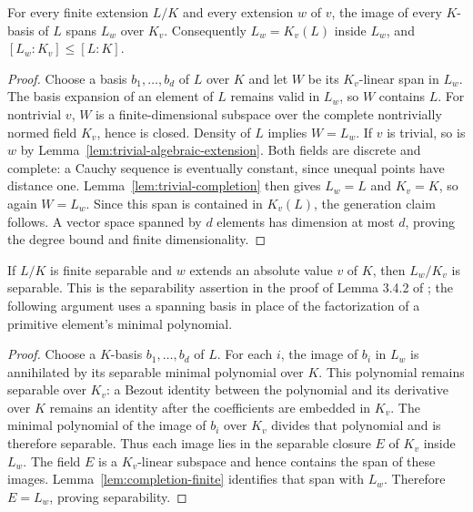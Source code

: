 \begin{lemma}\label{lem:completion-finite}
\leanok
{}
For every finite extension $L/K$ and every extension $w$ of $v$,
the image of every $K$-basis of $L$ spans $L_w$ over $K_v$.
Consequently $L_w=K_v(L)$ inside $L_w$, and $[L_w:K_v]\leq[L:K]$.
\end{lemma}
\begin{proof}
Choose a basis $b_1,\ldots,b_d$ of $L$ over $K$ and let $W$ be
its $K_v$-linear span in $L_w$. The basis expansion of an element of
$L$ remains valid in $L_w$, so $W$ contains $L$. For nontrivial $v$,
$W$ is a finite-dimensional subspace over the complete nontrivially
normed field $K_v$, hence is closed. Density of $L$ implies $W=L_w$.
If $v$ is trivial, so is $w$ by
Lemma~\ref{lem:trivial-algebraic-extension}. Both fields are discrete and complete:
a Cauchy sequence is eventually constant, since unequal points have distance
one. Lemma~\ref{lem:trivial-completion} then gives $L_w=L$ and $K_v=K$,
so again $W=L_w$. Since this span is contained in $K_v(L)$, the generation
claim follows. A vector space spanned by $d$ elements has dimension at most
$d$, proving the degree bound and finite dimensionality.
\end{proof}

\begin{lemma}
\label{lem:completion-separable}
\leanok
{}
If $L/K$ is finite separable and $w$ extends an absolute value $v$ of $K$,
then $L_w/K_v$ is separable. This is the separability assertion in the
proof of Lemma 3.4.2 of \cite{chen-moriwaki}; the following argument uses
a spanning basis in place of the factorization of a primitive element's
minimal polynomial.
\end{lemma}
\begin{proof}
Choose a $K$-basis $b_1,\ldots,b_d$ of $L$. For each $i$, the image of
$b_i$ in $L_w$ is annihilated by its separable minimal polynomial over
$K$. This polynomial remains separable over $K_v$: a Bezout identity
between the polynomial and its derivative over $K$ remains an identity
after the coefficients are embedded in $K_v$. The minimal polynomial of
the image of $b_i$ over $K_v$ divides that polynomial and is therefore
separable. Thus each image lies in the separable closure $E$ of $K_v$
inside $L_w$. The field $E$ is a $K_v$-linear subspace and hence contains
the span of these images. Lemma~\ref{lem:completion-finite} identifies
that span with $L_w$. Therefore $E=L_w$, proving separability.
\end{proof}


